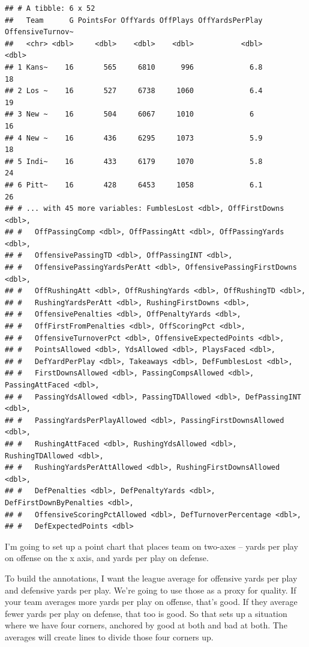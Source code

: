 \documentclass[
]{book}
\begin{document}
\begin{verbatim}
## # A tibble: 6 x 52
##   Team      G PointsFor OffYards OffPlays OffYardsPerPlay OffensiveTurnov~
##   <chr> <dbl>     <dbl>    <dbl>    <dbl>           <dbl>            <dbl>
## 1 Kans~    16       565     6810      996             6.8               18
## 2 Los ~    16       527     6738     1060             6.4               19
## 3 New ~    16       504     6067     1010             6                 16
## 4 New ~    16       436     6295     1073             5.9               18
## 5 Indi~    16       433     6179     1070             5.8               24
## 6 Pitt~    16       428     6453     1058             6.1               26
## # ... with 45 more variables: FumblesLost <dbl>, OffFirstDowns <dbl>,
## #   OffPassingComp <dbl>, OffPassingAtt <dbl>, OffPassingYards <dbl>,
## #   OffensivePassingTD <dbl>, OffPassingINT <dbl>,
## #   OffensivePassingYardsPerAtt <dbl>, OffensivePassingFirstDowns <dbl>,
## #   OffRushingAtt <dbl>, OffRushingYards <dbl>, OffRushingTD <dbl>,
## #   RushingYardsPerAtt <dbl>, RushingFirstDowns <dbl>,
## #   OffensivePenalties <dbl>, OffPenaltyYards <dbl>,
## #   OffFirstFromPenalties <dbl>, OffScoringPct <dbl>,
## #   OffensiveTurnoverPct <dbl>, OffensiveExpectedPoints <dbl>,
## #   PointsAllowed <dbl>, YdsAllowed <dbl>, PlaysFaced <dbl>,
## #   DefYardPerPlay <dbl>, Takeaways <dbl>, DefFumblesLost <dbl>,
## #   FirstDownsAllowed <dbl>, PassingCompsAllowed <dbl>, PassingAttFaced <dbl>,
## #   PassingYdsAllowed <dbl>, PassingTDAllowed <dbl>, DefPassingINT <dbl>,
## #   PassingYardsPerPlayAllowed <dbl>, PassingFirstDownsAllowed <dbl>,
## #   RushingAttFaced <dbl>, RushingYdsAllowed <dbl>, RushingTDAllowed <dbl>,
## #   RushingYardsPerAttAllowed <dbl>, RushingFirstDownsAllowed <dbl>,
## #   DefPenalties <dbl>, DefPenaltyYards <dbl>, DefFirstDownByPenalties <dbl>,
## #   OffensiveScoringPctAllowed <dbl>, DefTurnoverPercentage <dbl>,
## #   DefExpectedPoints <dbl>
\end{verbatim}

I'm going to set up a point chart that places team on two-axes -- yards per play on offense on the x axis, and yards per play on defense.

To build the annotations, I want the league average for offensive yards per play and defensive yards per play. We're going to use those as a proxy for quality. If your team averages more yards per play on offense, that's good. If they average fewer yards per play on defense, that too is good. So that sets up a situation where we have four corners, anchored by good at both and bad at both. The averages will create lines to divide those four corners up.
\end{document}

